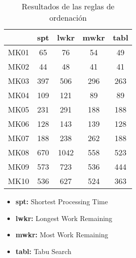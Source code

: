 \begin{table}[ht]
    \centering
    \begin{tabular}[ht]{|l|cccc|}
        \hline
                  & spt & lwkr & mwkr & tabl \\
        \hline
        MK01      & 65      & 76    & 54    & 49    \\
        MK02      & 44      & 48    & 41    & 41    \\
        MK03      & 397     & 506   & 296   & 263   \\
        MK04      & 109     & 121   & 89    & 89    \\
        MK05      & 231     & 291   & 188   & 188   \\
        MK06      & 128     & 143   & 139   & 128   \\
        MK07      & 188     & 238   & 262   & 188   \\
        MK08      & 670     & 1042  & 558   & 523   \\
        MK09      & 573     & 723   & 536   & 444   \\
        MK10      & 536     & 627   & 524   & 363   \\
        \hline
    \end{tabular}
    \caption{Resultados de las reglas de ordenación}
\end{table}

\begin{itemize}
    \item \textbf{spt:} Shortest Processing Time
    \item \textbf{lwkr:} Longest Work Remaining
    \item \textbf{mwkr:} Most Work Remaining
    \item \textbf{tabl:} Tabu Search
\end{itemize}
